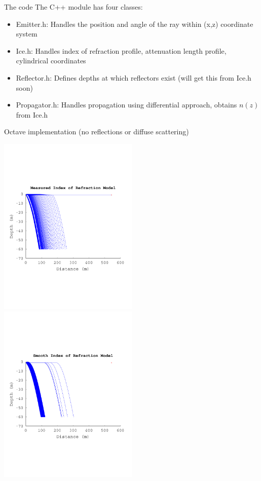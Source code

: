 \documentclass{beamer}
\begin{document}
\begin{frame}{The code}
The C++ module has four classes:
\begin{itemize}
\item Emitter.h: Handles the position and angle of the ray within (x,z) coordinate system
\item Ice.h: Handles index of refraction profile, attenuation length profile, cylindrical coordinates
\item Reflector.h: Defines depths at which reflectors exist (will get this from Ice.h soon)
\item Propagator.h: Handles propagation using differential approach, obtains $n(z)$ from Ice.h
\end{itemize}
\end{frame}

\begin{frame}{Octave implementation (no reflections or diffuse scattering)}
\begin{center}
\includegraphics[width=0.5\textwidth]{figures/April28_plot1.pdf}
\includegraphics[width=0.5\textwidth]{figures/April28_plot2.pdf}
\end{center}
\end{frame}
\end{document}
